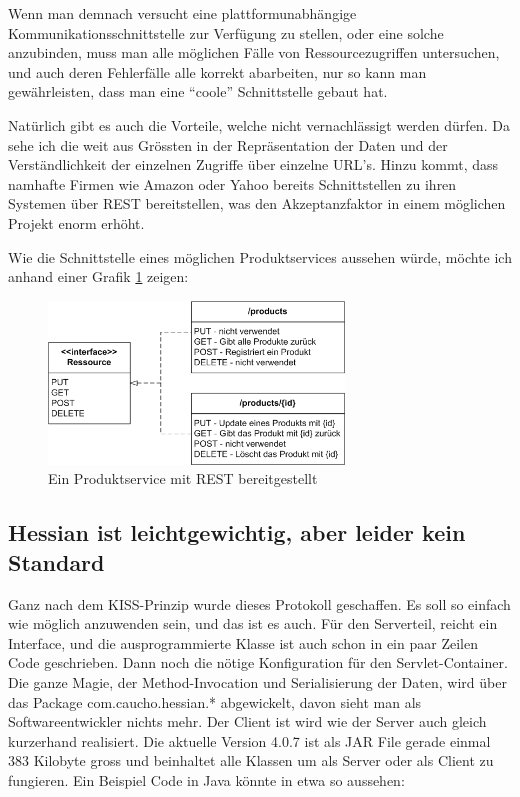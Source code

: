 \documentclass[abstracton, listof=totocnumbered,
bibliography=totocnumbered]{scrreprt}
\begin{document}
  Wenn man demnach versucht eine plattformunabhängige
  Kommunikationsschnittstelle zur Verfügung zu stellen, oder eine solche
  anzubinden, muss man alle möglichen Fälle von Ressourcezugriffen untersuchen,
  und auch deren Fehlerfälle alle korrekt abarbeiten, nur so kann man
  gewährleisten, dass man eine ``coole'' Schnittstelle gebaut hat.
  
  Natürlich gibt es auch die Vorteile, welche nicht vernachlässigt werden
  dürfen. Da sehe ich die weit aus Grössten in der Repräsentation der Daten und
  der Verständlichkeit der einzelnen Zugriffe über einzelne \ac{URL}'s. Hinzu
  kommt, dass namhafte Firmen wie Amazon oder Yahoo bereits Schnittstellen zu
  ihren Systemen über REST bereitstellen, was den Akzeptanzfaktor in einem
  möglichen Projekt enorm erhöht.

  Wie die Schnittstelle eines möglichen Produktservices aussehen würde, möchte
  ich anhand einer Grafik \ref{restPrinzip} zeigen:
  
  \begin{figure}[h]
    \begin{center}
      \includegraphics[width=0.7\textwidth]{./image/rest.png}
      \caption{Ein Produktservice mit REST bereitgestellt}
      \label{restPrinzip}
    \end{center}
  \end{figure}
  
  \subsection{Hessian ist leichtgewichtig, aber leider kein Standard}
  
  Ganz nach dem KISS-Prinzip\cite{KISS} wurde dieses Protokoll geschaffen. Es
  soll so einfach wie möglich anzuwenden sein, und das ist es auch. Für den
  Serverteil, reicht ein Interface, und die ausprogrammierte Klasse ist auch
  schon in ein paar Zeilen Code geschrieben. Dann noch die nötige Konfiguration
  für den Servlet-Container. Die ganze Magie, der Method-Invocation und
  Serialisierung der Daten, wird über das Package com.caucho.hessian.*
  abgewickelt, davon sieht man als Softwareentwickler nichts mehr. Der Client
  ist wird wie der Server auch gleich kurzerhand realisiert. Die aktuelle
  Version 4.0.7 ist als JAR File gerade einmal 383 Kilobyte gross und
  beinhaltet alle Klassen um als Server oder als Client zu fungieren. Ein
  Beispiel Code in Java könnte in etwa so aussehen:\\
\end{document}
